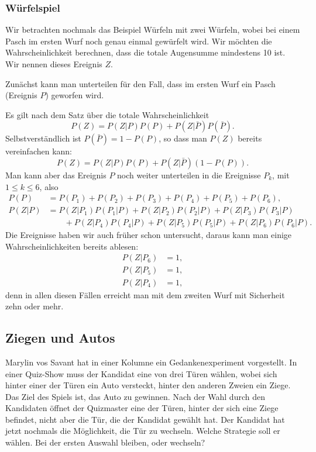 \subsubsection{Würfelspiel}
Wir betrachten nochmals das Beispiel Würfeln mit zwei Würfeln, wobei
bei einem Pasch im ersten Wurf noch genau einmal gewürfelt wird.
Wir möchten die Wahrscheinlichkeit berechnen, dass die totale Augensumme
mindestens 10 ist.
Wir nennen dieses Ereignis $Z$.

Zunächst kann man unterteilen für den Fall, dass im ersten Wurf
ein Pasch (Ereignis $P$) geworfen wird.

Es gilt nach dem Satz über die totale Wahrscheinlichkeit
\[
P(Z) = P(Z|P) P(P) + P(Z|\bar P) P(\bar P).
\]
Selbstverständlich ist $P(\bar P)=1-P(P)$, so dass man $P(Z)$ bereits
vereinfachen kann:
\[
P(Z) = P(Z|P) P(P) + P(Z|\bar P) (1-P(P)).
\]
Man kann aber das Ereignis $P$ noch weiter unterteilen in die
Ereignisse $P_k$, mit $1\le k\le 6$, also
\begin{align*}
P(P)&=
P(P_1)+
P(P_2)+
P(P_3)+
P(P_4)+
P(P_5)+
P(P_6),
\\
P(Z|P)
&=
P(Z|P_1)P(P_1|P)+
P(Z|P_2)P(P_2|P)+
P(Z|P_3)P(P_3|P)
\\
&\qquad +
P(Z|P_4)P(P_4|P)+
P(Z|P_5)P(P_5|P)+
P(Z|P_6)P(P_6|P).
\end{align*}
Die Ereignisse haben wir auch früher schon untersucht, daraus kann
man einige Wahrscheinlichkeiten bereits ablesen:
\begin{align*}
P(Z|P_6)&=1,\\
P(Z|P_5)&=1,\\
P(Z|P_4)&=1,
\end{align*}
denn in allen diesen Fällen erreicht man mit dem zweiten Wurf mit
Sicherheit zehn oder mehr.

\subsection{Ziegen und Autos} \label{ziegen:autos}
Marylin vos Savant hat in einer Kolumne ein Gedankenexperiment vorgestellt.
In einer Quiz-Show muss der Kandidat eine von drei Türen wählen, wobei
sich hinter einer der Türen ein Auto versteckt, hinter den anderen Zweien
ein Ziege.
Das Ziel des Spiels ist, das Auto zu gewinnen.
Nach der Wahl
durch den Kandidaten öffnet der Quizmaster eine der Türen, hinter der sich
eine Ziege befindet, nicht aber die Tür, die der Kandidat gewählt hat.
Der Kandidat hat jetzt nochmals die Möglichkeit, die Tür zu wechseln.
Welche Strategie soll er wählen.
Bei der ersten Auswahl bleiben, oder
wechseln?

